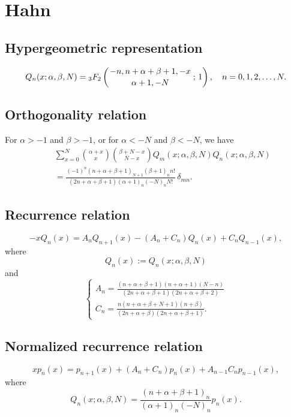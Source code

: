 \documentclass[envcountchap,graybox]{svmono}
\newcommand{\hyp}[5]{\mbox{}_{#1}{F}_{#2}
\left(\genfrac{}{}{0pt}{}{#3}{#4}\,;\,#5\right)}
\begin{document}
\section{Hahn}

\par\setcounter{equation}{0}

\subsection*{Hypergeometric representation}
\begin{equation}
\label{DefHahn}
Q_n(x;\alpha,\beta,N)=\hyp{3}{2}{-n,n+\alpha+\beta+1,-x}{\alpha+1,-N}{1},\quad n=0,1,2,\ldots,N.
\end{equation}

\subsection*{Orthogonality relation}
For $\alpha>-1$ and $\beta>-1$, or for $\alpha<-N$ and $\beta<-N$, we have
\begin{eqnarray}
\label{OrtHahn}
& &\sum_{x=0}^N\binom{\alpha +x}{x}\binom{\beta+N-x}{N-x}Q_m(x;\alpha,\beta,N)Q_n(x;\alpha,\beta,N)\nonumber\\
& &{}=\frac{(-1)^n(n+\alpha+\beta+1)_{N+1}(\beta+1)_nn!}{(2n+\alpha+\beta+1)(\alpha+1)_n(-N)_nN!}\,\delta_{mn}.
\end{eqnarray}

\subsection*{Recurrence relation}
\begin{equation}
\label{RecHahn}
-xQ_n(x)=A_nQ_{n+1}(x)-\left(A_n+C_n\right)Q_n(x)+C_nQ_{n-1}(x),
\end{equation}
where
$$Q_n(x):=Q_n(x;\alpha,\beta,N)$$
and
$$\left\{\begin{array}{l}
\displaystyle A_n=\frac{(n+\alpha+\beta+1)(n+\alpha+1)(N-n)}{(2n+\alpha+\beta+1)(2n+\alpha+\beta+2)}\\[5mm]
\displaystyle C_n=\frac{n(n+\alpha+\beta+N+1)(n+\beta)}{(2n+\alpha+\beta)(2n+\alpha+\beta+1)}.
\end{array}\right.$$

\subsection*{Normalized recurrence relation}
\begin{equation}
\label{NormRecHahn}
xp_n(x)=p_{n+1}(x)+\left(A_n+C_n\right)p_n(x)+A_{n-1}C_np_{n-1}(x),
\end{equation}
where
$$Q_n(x;\alpha,\beta,N)=\frac{(n+\alpha+\beta+1)_n}{(\alpha+1)_n(-N)_n}p_n(x).$$
\end{document}
